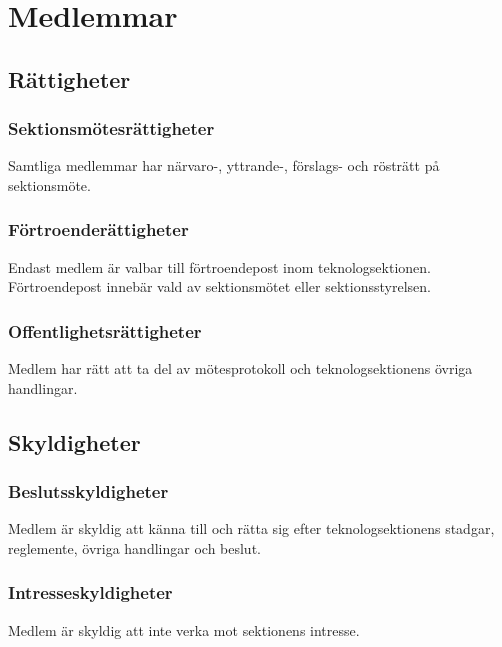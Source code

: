 \section{Medlemmar}

\subsection{Rättigheter}

\subsubsection{Sektionsmötesrättigheter}
Samtliga medlemmar har närvaro-, yttrande-, förslags- och rösträtt på sektionsmöte.

\subsubsection{Förtroenderättigheter}
Endast medlem är valbar till förtroendepost inom teknologsektionen. Förtroendepost innebär vald av sektionsmötet eller sektionsstyrelsen.

\subsubsection{Offentlighetsrättigheter}
Medlem har rätt att ta del av mötesprotokoll och teknologsektionens övriga handlingar.

\subsection{Skyldigheter}

\subsubsection{Beslutsskyldigheter}
Medlem är skyldig att känna till och rätta sig efter teknologsektionens stadgar, reglemente, övriga handlingar och beslut.

\subsubsection{Intresseskyldigheter}
Medlem är skyldig att inte verka mot sektionens intresse.

